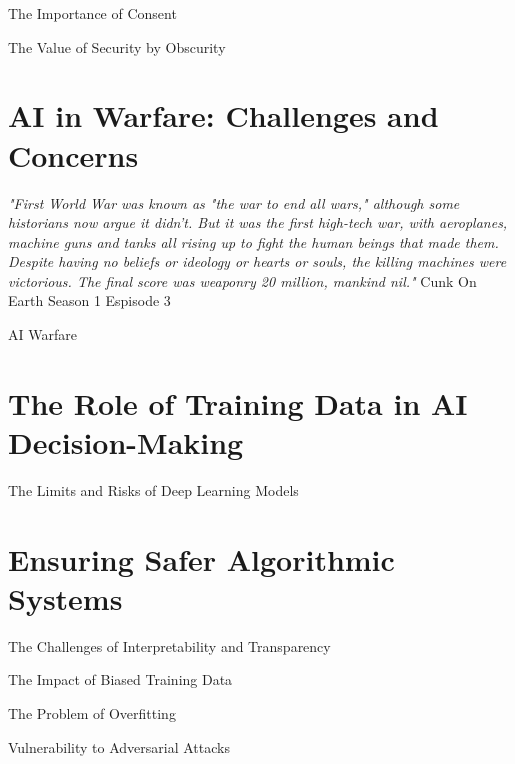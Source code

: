 The Importance of Consent

The Value of Security by Obscurity

\section{AI in Warfare: Challenges and Concerns}

\textit{"First World War was known as "the war to end all wars," although some historians now argue it didn't. But it was the first high-tech war, with aeroplanes, machine guns and tanks all rising up to fight the human beings that made them. Despite having no beliefs or ideology or hearts or souls, the killing machines were victorious. The final score was weaponry 20 million, mankind nil."} Cunk On Earth Season 1 Espisode 3 \cite{cunkonearth}

AI Warfare \cite{aiwarfare}

\section{The Role of Training Data in AI Decision-Making}

The Limits and Risks of Deep Learning Models

\section{Ensuring Safer Algorithmic Systems}
\cite{saferalgorithmicsystems}

The Challenges of Interpretability and Transparency

The Impact of Biased Training Data

The Problem of Overfitting

Vulnerability to Adversarial Attacks

